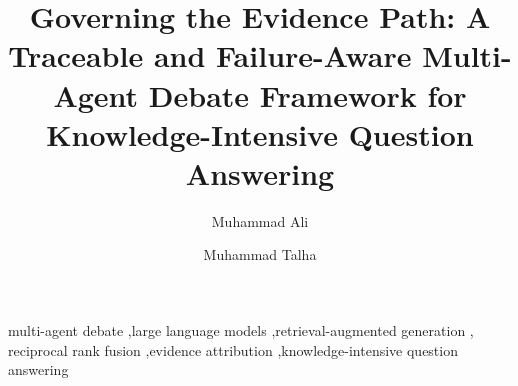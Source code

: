 \documentclass[preprint,12pt]{elsarticle}
\begin{document}
\begin{frontmatter}

\title{Governing the Evidence Path: A Traceable and Failure-Aware Multi-Agent Debate Framework for Knowledge-Intensive Question Answering}

\author[iu]{Muhammad Ali}
\author[iu]{Muhammad Talha}



\begin{keyword}
multi-agent debate \sep large language models \sep retrieval-augmented generation \sep
reciprocal rank fusion \sep evidence attribution \sep knowledge-intensive question answering
\end{keyword}

\end{frontmatter}
















\end{document}
